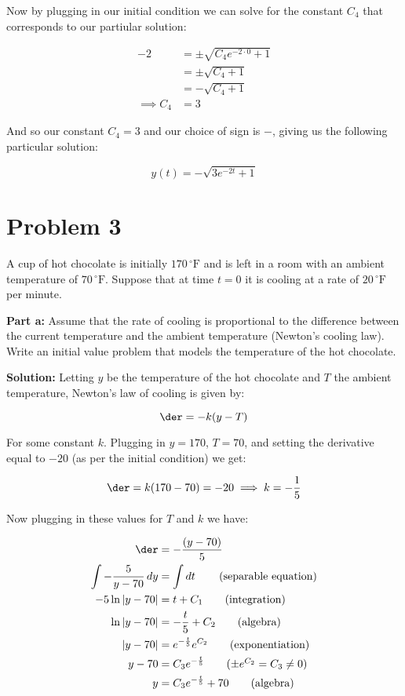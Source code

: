\documentclass{article}
\begin{document}
Now by plugging in our initial condition we can solve for the constant $C_4$ that corresponds to our partiular solution:

\begin{align*}
    -2&=\pm\sqrt{C_4e^{-2\cdot0}+1}\tag{$(t,y)=(0,-2)$}\\
    &=\pm\sqrt{C_4+1}\\
    &=-\sqrt{C_4+1}\tag{$+$ case impossible}\\
    \implies C_4&=3
\end{align*}

And so our constant $C_4=3$ and our choice of sign is $-$, giving us the following particular solution:

\begin{equation*}
    y(t)=-\sqrt{3e^{-2t}+1}
\end{equation*}

\section*{Problem 3}
A cup of hot chocolate is initially $170\,{^\circ\text{F}}$ and is left in a room with an ambient temperature of $70\,{^\circ\text{F}}$. Suppose that at time $t=0$ it is cooling at a rate of $20\,{^\circ\text{F}}$ per minute.
\bigskip

\noindent\textbf{Part a:} Assume that the rate of cooling is proportional to the difference between the current temperature and the ambient temperature (Newton's cooling law). Write an initial value problem that models the temperature of the hot chocolate.
\bigskip

\noindent\textbf{Solution:} Letting $y$ be the temperature of the hot chocolate and $T$ the ambient temperature, Newton's law of cooling is given by:

\begin{equation*}
    \der=-k(y-T)
\end{equation*}

For some constant $k$. Plugging in $y=170$, $T=70$, and setting the derivative equal to $-20$ (as per the initial condition) we get:

\begin{equation*}
    \der=k(170-70)=-20\implies k=-\frac{1}{5}\\    
\end{equation*}
\smallskip

Now plugging in these values for $T$ and $k$ we have:

\begin{align*}
    \der&=-\frac{(y-70)}{5}\\
    \int-\frac{5}{y-70}\mathop{dy}&=\int\mathop{dt}\tag{separable equation}\\
    -5\ln|y-70|&=t+C_1\tag{integration}\\
    \ln|y-70|&=-\frac{t}{5}+C_2\tag{algebra}\\
    |y-70|&=e^{-\frac{t}{5}}e^{C_2}\tag{exponentiation}\\
    y-70&=C_3e^{-\frac{t}{5}}\tag{$\pm e^{C_2}=C_3\not=0$}\\
    y&=C_3e^{-\frac{t}{5}}+70\tag{algebra}
\end{align*}
\end{document}
